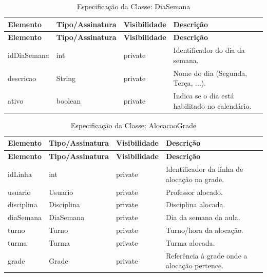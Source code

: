 \fonteautores

\vspace{\baselineskip}

\Needspace{0.32\textheight}
\begin{longtable}{|L{3.5cm}|L{3.5cm}|L{3.5cm}|L{3.5cm}|}
\caption{Especificação da Classe: DiaSemana} \\
\hline
\textbf{Elemento} & \textbf{Tipo/Assinatura} & \textbf{Visibilidade} & \textbf{Descrição} \\
\hline
\endfirsthead
\hline
\textbf{Elemento} & \textbf{Tipo/Assinatura} & \textbf{Visibilidade} & \textbf{Descrição} \\
\hline
\endhead
idDiaSemana & int & private & Identificador do dia da semana. \\
\hline
descricao & String & private & Nome do dia (Segunda, Terça, ...). \\
\hline
ativo & boolean & private & Indica se o dia está habilitado no calendário. \\
\hline
\end{longtable}

\fonteautores

\vspace{\baselineskip}

\Needspace{0.32\textheight}
\begin{longtable}{|L{3.5cm}|L{3.5cm}|L{3.5cm}|L{3.5cm}|}
\caption{Especificação da Classe: AlocacaoGrade} \\
\hline
\textbf{Elemento} & \textbf{Tipo/Assinatura} & \textbf{Visibilidade} & \textbf{Descrição} \\
\hline
\endfirsthead
\hline
\textbf{Elemento} & \textbf{Tipo/Assinatura} & \textbf{Visibilidade} & \textbf{Descrição} \\
\hline
\endhead
idLinha & int & private & Identificador da linha de alocação na grade. \\
\hline
usuario & Usuario & private & Professor alocado. \\
\hline
disciplina & Disciplina & private & Disciplina alocada. \\
\hline
diaSemana & DiaSemana & private & Dia da semana da aula. \\
\hline
turno & Turno & private & Turno/hora da alocação. \\
\hline
turma & Turma & private & Turma alocada. \\
\hline
grade & Grade & private & Referência à grade onde a alocação pertence. \\
\hline
\end{longtable}


